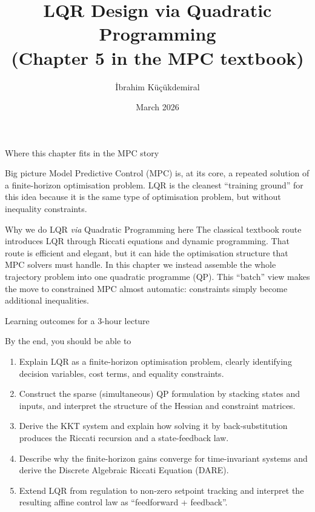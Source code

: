 \documentclass[aspectratio=169,11pt]{beamer}
\title[LQR via QP]{LQR Design via Quadratic Programming\\\small (Chapter 5 in the MPC textbook)}
\author{\tiny { İbrahim Küçükdemiral}}
\date{\small March 2026}
\begin{document}
\begin{frame}
  \titlepage
\end{frame}


\begin{frame}{Where this chapter fits in the MPC story}
\begin{block}{Big picture}
Model Predictive Control (MPC) is, at its core, a repeated solution of a finite-horizon optimisation problem. LQR is the cleanest ``training ground'' for this idea because it is the same type of optimisation problem, but without inequality constraints.
\end{block}

\begin{block}{Why we do LQR \emph{via} Quadratic Programming here}
The classical textbook route introduces LQR through Riccati equations and dynamic programming. That route is efficient and elegant, but it can hide the optimisation structure that MPC solvers must handle.
In this chapter we instead assemble the whole trajectory problem into one quadratic programme (QP). This ``batch'' view makes the move to constrained MPC almost automatic: constraints simply become additional inequalities.
\end{block}
\end{frame}

\begin{frame}{Learning outcomes for a 3-hour lecture}
\begin{block}{By the end, you should be able to}
\begin{enumerate}
  \item Explain LQR as a finite-horizon optimisation problem, clearly identifying decision variables, cost terms, and equality constraints.
  \item Construct the sparse (simultaneous) QP formulation by stacking states and inputs, and interpret the structure of the Hessian and constraint matrices.
  \item Derive the KKT system and explain how solving it by back-substitution produces the Riccati recursion and a state-feedback law.
  \item Describe why the finite-horizon gains converge for time-invariant systems and derive the Discrete Algebraic Riccati Equation (DARE).
  \item Extend LQR from regulation to non-zero setpoint tracking and interpret the resulting affine control law as ``feedforward + feedback''.
\end{enumerate}
\end{block}
\end{frame}
\end{document}
